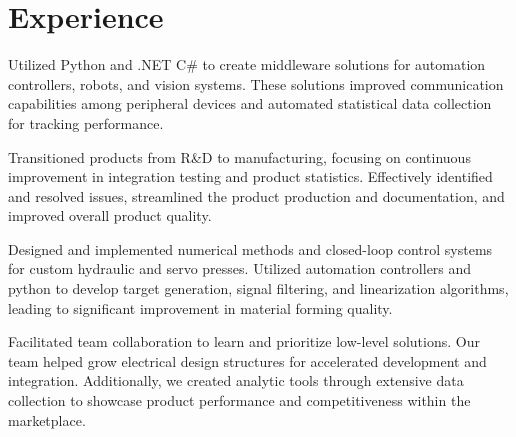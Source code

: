 \documentclass[]{TTurner}
\begin{document}

\begin{minipage}[t]{0.7\textwidth} 

\section{Experience}
\vspace{\topsep}
\begin{tightemize}
\sectionsep
\item Utilized Python and .NET C\# to create middleware solutions for automation controllers, robots, and vision systems. These solutions improved communication capabilities among peripheral devices and automated statistical data collection for tracking performance.
\item Transitioned products from R\&D to manufacturing, focusing on continuous improvement in integration testing and product statistics. Effectively identified and resolved issues, streamlined the product production and documentation, and improved overall product quality. 
\end{tightemize}
\sectionsep

\begin{tightemize}
\sectionsep
\item Designed and implemented numerical methods and closed-loop control systems for custom hydraulic and servo presses. Utilized automation controllers and python to develop target generation, signal filtering, and linearization algorithms, leading to significant improvement in material forming quality.
\item Facilitated team collaboration to learn and prioritize low-level solutions. Our team helped grow electrical design structures for accelerated development and integration. Additionally, we created analytic tools through extensive data collection to showcase product performance and competitiveness within the marketplace. 
\end{tightemize}
\sectionsep


\end{minipage}
\end{document}
